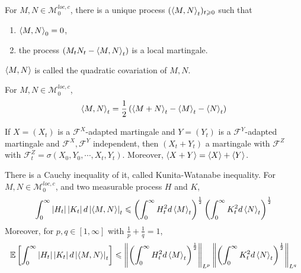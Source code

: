 \documentclass[a4paper,12pt]{article}
\begin{document}
\begin{itemize}
  \begin{thm}
    For $M,N\in \mathcal{M}_0^{loc,c}$, there is a unique process $(\left\langle M,N \right\rangle_t)_{t \geqslant 0}$ such that
    \begin{enumerate}[label=(\arabic*)]
      \item $\left\langle M,N \right\rangle_0 = 0$,
      \item the process $(M_tN_t - \left\langle M,N \right\rangle_t)$ is a local martingale.
    \end{enumerate}
    $\left\langle M,N \right\rangle$ is called the quadratic covariation of $M,N$.
  \end{thm}
  For $M,N\in \mathcal{M}_0^{loc,c}$, 
  \begin{equation*}
    \left\langle M,N \right\rangle_t = \frac{1}{2}\left(\left\langle M+N \right\rangle_t - \left\langle M \right\rangle_t - \left\langle N \right\rangle_t\right)
  \end{equation*}
  \begin{lem}\label{lem2}
    If $X=(X_t)$ is a $\mathcal{F}^X$-adapted martingale and $Y=(Y_t)$ is a $\mathcal{F}^Y$-adapted martingale and $\mathcal{F}^X, \mathcal{F}^Y$ independent, then $(X_t + Y_t)$ a martingale with $\mathcal{F}^{Z}$ with $\mathcal{F}^{Z}_t = \sigma(X_0,Y_0,\cdots,X_t,Y_t)$. Moreover, $\left\langle X + Y \right\rangle = \left\langle X \right\rangle + \left\langle Y \right\rangle$.
  \end{lem}

  There is a Cauchy inequality of it, called Kunita-Watanabe inequality. For $M,N\in \mathcal{M}_0^{loc,c}$, and two measurable process $H$ and $K$,
  \begin{equation*}
    \int_0^{\infty} \left\lvert H_t\right\lvert\left\lvert K_t\right\lvert d \left\lvert\left\langle M,N \right\rangle\right\lvert_t \leqslant \left(\int_0^{\infty} H_t^2d\left\langle M \right\rangle_t\right)^{\frac{1}{2}}\left(\int_0^{\infty} K_t^2d\left\langle N \right\rangle_t\right)^{\frac{1}{2}}
  \end{equation*}
  Moreover, for $p,q \in [1,\infty]$ with $\frac{1}{p}+\frac{1}{q} = 1$,
  \begin{equation*}
     \mathbb{E}\left[\int_0^{\infty} \left\lvert H_t\right\lvert\left\lvert K_t\right\lvert d \left\lvert\left\langle M,N \right\rangle\right\lvert_t\right] \leqslant \left\lVert\left(\int_0^{\infty} H_t^2d\left\langle M \right\rangle_t\right)^{\frac{1}{2}}\right\lVert_{L^p}\left\lVert\left(\int_0^{\infty} K_t^2d\left\langle N \right\rangle_t\right)^{\frac{1}{2}}\right\lVert_{L^q}
  \end{equation*}


\end{itemize}
\end{document}
